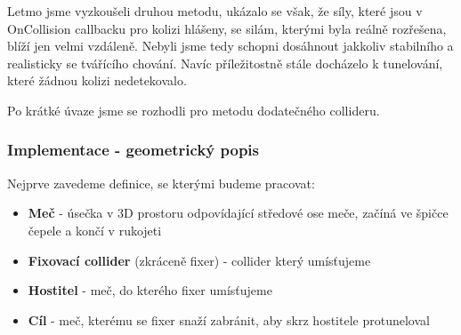 Letmo jsme vyzkoušeli druhou metodu, ukázalo se však, že síly, které jsou v OnCollision callbacku pro kolizi hlášeny, se silám, kterými byla reálně rozřešena, blíží jen velmi vzdáleně. Nebyli jsme tedy schopni dosáhnout jakkoliv stabilního a realisticky se tvářícího chování. Navíc příležitostně stále docházelo k tunelování, které žádnou kolizi nedetekovalo.

\bigbreak

Po krátké úvaze jsme se rozhodli pro metodu dodatečného collideru.



\subsubsection*{Implementace - geometrický popis}

Nejprve zavedeme definice, se kterými budeme pracovat:
\begin{itemize}
  \item \textbf{Meč} - úsečka v 3D prostoru odpovídající středové ose meče, začíná ve špičce čepele a končí v rukojeti
  \item \textbf{Fixovací collider} (zkráceně fixer) - collider který umísťujeme 
  \item \textbf{Hostitel} - meč, do kterého fixer umísťujeme
  \item \textbf{Cíl} - meč, kterému se fixer snaží zabránit, aby skrz hostitele protuneloval
\end{itemize}


